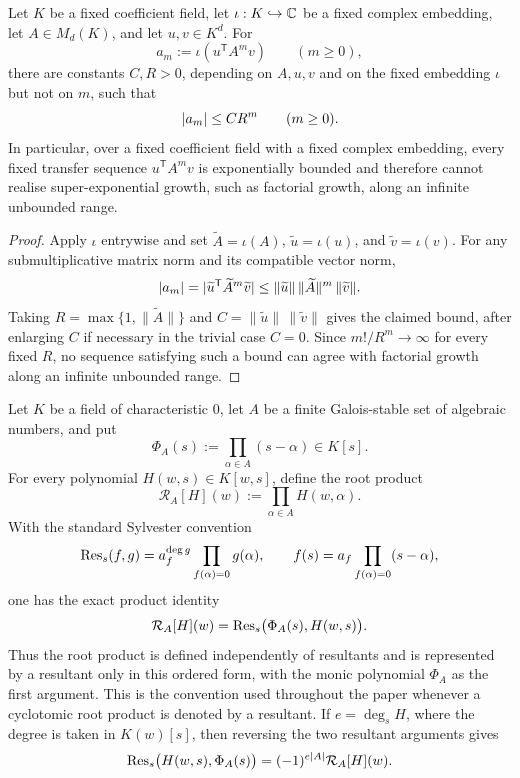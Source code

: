 \begin{lemma}
  \label{lem:fixed-field-transfer-exponential-bound}
  Let \(K\) be a fixed coefficient field, let
  \(\iota:K\hookrightarrow\mathbb{C}\) be a fixed complex embedding, let
  \(A\in M_d(K)\), and let \(u,v\in K^d\).  For
  \[
    a_m:=\iota\!\left(u^{\mathsf T}A^m v\right)\qquad(m\ge0),
  \]
  there are constants \(C,R>0\), depending on \(A,u,v\) and on the fixed
  embedding \(\iota\) but not on \(m\), such that
  \[
    \lvert a_m \rvert\le C R^m\qquad(m\ge0).
  \]
  In particular, over a fixed coefficient field with a fixed complex
  embedding, every fixed transfer sequence \(u^{\mathsf T}A^m v\) is
  exponentially bounded and therefore cannot realise super-exponential
  growth, such as factorial growth, along an infinite unbounded range.
\end{lemma}

\begin{proof}
Apply \(\iota\) entrywise and set
\(\widetilde A=\iota(A)\), \(\widetilde u=\iota(u)\), and
\(\widetilde v=\iota(v)\).  For any submultiplicative matrix norm and
its compatible vector norm,
\[
  \lvert a_m \rvert
  =\lvert \widetilde u^{\mathsf T}\widetilde A^m\widetilde v \rvert
  \le \|\widetilde u\|\,\|\widetilde A\|^m\,\|\widetilde v\|.
\]
Taking \(R=\max\{1,\|\widetilde A\|\}\) and
\(C=\|\widetilde u\|\,\|\widetilde v\|\) gives the claimed bound, after
enlarging \(C\) if necessary in the trivial case \(C=0\).  Since
\(m!/R^m\to\infty\) for every fixed \(R\), no sequence satisfying such a
bound can agree with factorial growth along an infinite unbounded range.
\end{proof}


\begin{lemma}
  \label{lem:ordered-cyclotomic-resultant}
  Let \(K\) be a field of characteristic \(0\), let \(A\) be a finite
  Galois-stable set of algebraic numbers, and put
  \[
    \Phi_A(s):=\prod_{\alpha\in A}(s-\alpha)\in K[s].
  \]
  For every polynomial \(H(w,s)\in K[w,s]\), define the root product
  \[
    \mathcal R_A[H](w):=\prod_{\alpha\in A}H(w,\alpha).
  \]
  With the standard Sylvester convention \cite{CoxLittleOShea2005}
  \[
    \operatorname{Res}_s(f,g)=a_f^{\deg g}\prod_{f(\alpha)=0}g(\alpha),
    \qquad f(s)=a_f\prod_{f(\alpha)=0}(s-\alpha),
  \]
  one has the exact product identity
  \[
    \mathcal R_A[H](w)
    =\operatorname{Res}_s\bigl(\Phi_A(s),H(w,s)\bigr).
  \]
  Thus the root product is defined independently of resultants and is
  represented by a resultant only in this ordered form, with the monic
  polynomial \(\Phi_A\) as the first argument. This is the convention
  used throughout the paper whenever a cyclotomic root product is
  denoted by a resultant.
  If \(e=\deg_s H\), where the degree is taken in \(K(w)[s]\), then
  reversing the two resultant arguments gives
  \[
    \operatorname{Res}_s\bigl(H(w,s),\Phi_A(s)\bigr)
      =(-1)^{e|A|}\mathcal R_A[H](w).
  \]
\end{lemma}

